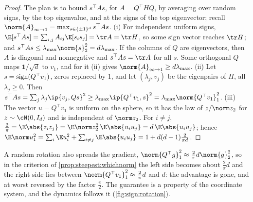 \begin{refsection}

\begin{proof}
The plan is to bound $s^\top As$, for $A=Q^\top HQ$, by averaging over random signs, by the top eigenvalue, and at the signs of the top eigenvector; recall $\norm{A}_{\infty\to1}=\max_{s\in\{\pm1\}^d}s^\top As$. (i) For independent uniform signs, $\E[s^\top As]=\sum_{i,j}A_{ij}\E[s_is_j]=\tr A=\tr H$, so some sign vector reaches $\tr H$; and $s^\top As\le\lmax\norm{s}_2^2=d\lmax$. If the columns of $Q$ are eigenvectors, then $A$ is diagonal and nonnegative and $s^\top As=\tr A$ for all $s$. Some orthogonal $Q$ maps $\mathbf1/\sqrt d$ to $v_1$, and for it (ii) gives $\norm{A}_{\infty\to1}\ge d\lmax$. (ii) Let $s=\operatorname{sign}(Q^\top v_1)$, zeros replaced by $1$, and let $(\lambda_j,v_j)$ be the eigenpairs of $H$, all $\lambda_j\ge0$. Then $s^\top As=\sum_j\lambda_j\ip{v_j,Qs}^2\ge\lmax\ip{Q^\top v_1,s}^2=\lmax\norm{Q^\top v_1}_1^2$. (iii) The vector $u=Q^\top v_1$ is uniform on the sphere, so it has the law of $z/\norm z_2$ for $z\sim\cN(0,I_d)$ and is independent of $\norm z_2$. For $i\ne j$, $\frac2\pi=\E\abs{z_iz_j}=\E\norm z_2^2\,\E\abs{u_iu_j}=d\,\E\abs{u_iu_j}$; hence $\E\norm u_1^2=\sum_i\E u_i^2+\sum_{i\ne j}\E\abs{u_iu_j}=1+d(d-1)\frac{2}{\pi d}$.
\end{proof}

A random rotation also spreads the gradient, $\norm{Q^\top g}_1^2\approx\frac2\pi d\norm{g}_2^2$, so in the criterion of \cref{prop:steepest:whichnorm} the left side becomes about $\frac2\pi d$ and the right side lies between $\norm{Q^\top v_1}_1^2\approx\frac2\pi d$ and $d$: the advantage is gone, and at worst reversed by the factor $\frac\pi2$. The guarantee is a property of the coordinate system, and the dynamics follows it (\cref{fig:sign:rotation}).


\end{refsection}
